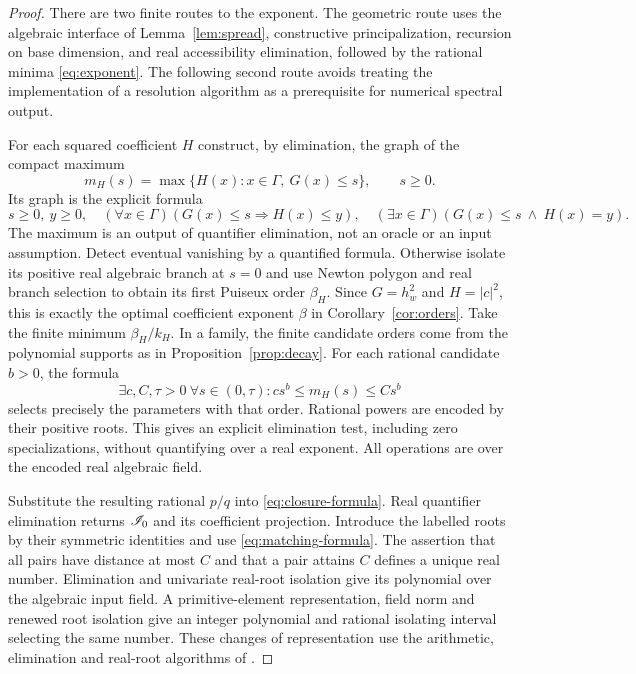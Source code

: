\begin{proof}
There are two finite routes to the exponent. The geometric route uses
the algebraic interface of Lemma~\ref{lem:spread}, constructive
principalization, recursion on base dimension, and real accessibility
elimination, followed by the rational minima \eqref{eq:exponent}.
The following second route avoids treating the implementation of a
resolution algorithm as a prerequisite for numerical spectral output.

For each squared coefficient $H$ construct, by elimination, the graph
of the compact maximum
\[
 m_H(s)=\max\{H(x):x\in\Gamma,\ G(x)\le s\},\qquad s\ge0.
\]
Its graph is the explicit formula
\[
 s\ge0,\ y\ge0,\quad
 (\forall x\in\Gamma)(G(x)\le s\Rightarrow H(x)\le y),\quad
 (\exists x\in\Gamma)(G(x)\le s\ \wedge\ H(x)=y).
\]
The maximum is an output of quantifier elimination, not an oracle or an
input assumption. Detect eventual vanishing by a quantified formula.
Otherwise isolate its positive real algebraic branch at $s=0$ and use
Newton polygon and real branch selection to obtain its first Puiseux
order $\beta_H$. Since $G=h_w^2$ and $H=|c|^2$, this is exactly the
optimal coefficient exponent $\beta$ in Corollary~\ref{cor:orders}.
Take the finite minimum $\beta_H/k_H$. In a family, the finite candidate
orders come from the polynomial supports as in Proposition~\ref{prop:decay}.
For each rational candidate $b>0$, the formula
\[
 \exists c,C,\tau>0\ \forall s\in(0,\tau):
                   c s^b\le m_H(s)\le C s^b
\]
selects precisely the parameters with that order. Rational powers are
encoded by their positive roots. This gives an explicit elimination
test, including zero specializations, without quantifying over a real
exponent. All operations are over the encoded real algebraic field.

Substitute the resulting rational $p/q$ into
\eqref{eq:closure-formula}. Real quantifier elimination returns
$\mathscr I_0$ and its coefficient projection. Introduce the labelled roots
by their symmetric identities and use \eqref{eq:matching-formula}.
The assertion that all pairs have distance at most $C$ and that a pair
attains $C$ defines a unique real number. Elimination and univariate
real-root isolation give its polynomial over the algebraic input field.
A primitive-element representation, field norm and renewed root isolation
give an integer polynomial and rational isolating interval selecting the
same number. These changes of representation use the arithmetic,
elimination and real-root algorithms of \cite{BPR06,BCR98}.


\end{proof}
